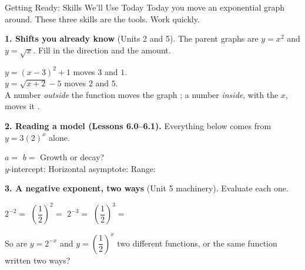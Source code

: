 \documentclass[10pt]{article}
\begin{document}
\namedateperiod

\vspace{0.10in}

\begin{notesbox}{Getting Ready: Skills We'll Use Today}
\small Today you move an exponential graph around. These three skills are the tools. Work quickly.

\vspace{4pt}
\textbf{1. Shifts you already know} (Units 2 and 5). The parent graphs are $y=x^{2}$ and
$y=\sqrt{x}$. Fill in the direction and the amount.

\vspace{3pt}
\hspace*{1.2em} $y=(x-3)^{2}+1$ \; moves \blank{1.6cm} $3$ \; and \blank{1.6cm} $1$. \\[3pt]
\hspace*{1.2em} $y=\sqrt{x+2}-5$ \; moves \blank{1.6cm} $2$ \; and \blank{1.6cm} $5$. \\[3pt]
\hspace*{1.2em} A number \emph{outside} the function moves the graph \blank{2.4cm}; a number
\emph{inside}, with the $x$, moves it \blank{2.4cm}.

\vspace{6pt}
\textbf{2. Reading a model (Lessons 6.0--6.1).} Everything below comes from $y=3(2)^{x}$ alone.

\vspace{3pt}
\hspace*{1.2em} $a=$ \blank{1.4cm} \quad $b=$ \blank{1.4cm} \quad Growth or decay?
\blank{2.0cm} \\[4pt]
\hspace*{1.2em} $y$-intercept: \blank{2.0cm} \quad Horizontal asymptote: \blank{2.0cm} \quad
Range: \blank{2.4cm}

\vspace{6pt}
\textbf{3. A negative exponent, two ways} (Unit 5 machinery). Evaluate each one.

\vspace{3pt}
\hspace*{1.2em} $2^{-2}=$ \blank{1.4cm} \qquad $\left(\dfrac{1}{2}\right)^{2}=$ \blank{1.4cm}
\qquad $2^{-3}=$ \blank{1.4cm} \qquad $\left(\dfrac{1}{2}\right)^{3}=$ \blank{1.4cm}

\vspace{4pt}
\hspace*{1.2em} So are $y=2^{-x}$ and $y=\left(\dfrac{1}{2}\right)^{x}$ two different functions, or
the same function written two ways? \blank{4.0cm}

\end{notesbox}
\end{document}
